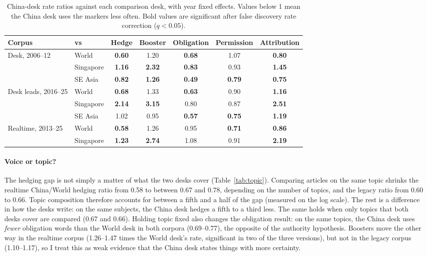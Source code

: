 \documentclass[11pt]{article}
\begin{document}
\begin{table}[tbp]
\centering
\small
\begin{tabular}{@{}llccccc@{}}
\toprule
Corpus & vs & Hedge & Booster & Obligation & Permission & Attribution \\
\midrule
Desk, 2006--12 & World & \textbf{0.60} & 1.20 & \textbf{0.68} & 1.07 & \textbf{0.80} \\
 & Singapore & \textbf{1.16} & \textbf{2.32} & \textbf{0.83} & 0.93 & \textbf{1.45} \\
 & SE Asia & \textbf{0.82} & \textbf{1.26} & \textbf{0.49} & \textbf{0.79} & \textbf{0.75} \\
\addlinespace
Desk leads, 2016--25 & World & \textbf{0.68} & 1.33 & \textbf{0.63} & 0.90 & \textbf{1.16} \\
 & Singapore & \textbf{2.14} & \textbf{3.15} & 0.80 & 0.87 & \textbf{2.51} \\
 & SE Asia & 1.02 & 0.95 & \textbf{0.57} & \textbf{0.75} & \textbf{1.19} \\
\addlinespace
Realtime, 2013--25 & World & \textbf{0.58} & 1.26 & 0.95 & \textbf{0.71} & \textbf{0.86} \\
 & Singapore & \textbf{1.23} & \textbf{2.74} & 1.08 & 0.91 & \textbf{2.19} \\
\bottomrule
\end{tabular}
\caption{China-desk rate ratios against each comparison desk, with year fixed effects. Values below 1 mean the China desk uses the markers less often. Bold values are significant after false discovery rate correction ($q < 0.05$).}
\label{tab:longrun}
\end{table}

\paragraph{Voice or topic?} The hedging gap is not simply a matter of what the two desks cover (Table~\ref{tab:topic}). Comparing articles on the same topic shrinks the realtime China/World hedging ratio from 0.58 to between 0.67 and 0.78, depending on the number of topics, and the legacy ratio from 0.60 to 0.66. Topic composition therefore accounts for between a fifth and a half of the gap (measured on the log scale). The rest is a difference in how the desks write: on the same subjects, the China desk hedges a fifth to a third less. The same holds when only topics that both desks cover are compared (0.67 and 0.66). Holding topic fixed also changes the obligation result: on the same topics, the China desk uses \textit{fewer} obligation words than the World desk in both corpora (0.69--0.77), the opposite of the authority hypothesis. Boosters move the other way in the realtime corpus (1.26--1.47 times the World desk's rate, significant in two of the three versions), but not in the legacy corpus (1.10--1.17), so I treat this as weak evidence that the China desk states things with more certainty.
\end{document}
